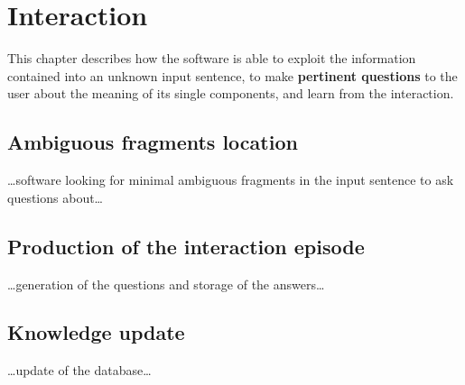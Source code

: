 
\chapter{Interaction} %

\label{ch:interaction} %


This chapter describes how the \pname software is able to exploit the information contained into an unknown input sentence, to make \textbf{pertinent questions} to the user about the meaning of its single components, and learn from the interaction. 


\section{Ambiguous fragments location}

\ldots software looking for minimal ambiguous fragments in the input sentence to ask questions about\ldots


\section{Production of the interaction episode}

\ldots generation of the questions and storage of the answers\ldots


\section{Knowledge update}

\ldots update of the database\ldots
